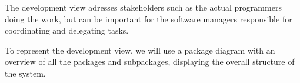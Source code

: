 The development view adresses stakeholders such as the actual programmers doing the work, but can be important for the software managers responsible for coordinating and delegating tasks.

To represent the development view, we will use a package diagram with an overview of all the packages and subpackages, displaying the overall structure of the system.
